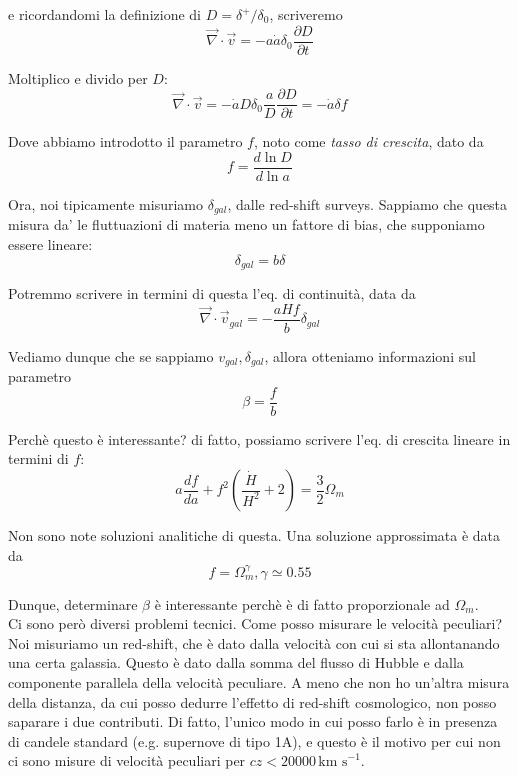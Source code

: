 \documentclass{report}
\begin{document}
e ricordandomi la definizione di $D = \delta^+/\delta_0$, scriveremo
\begin{equation}
    \vec{\nabla}\cdot \vec{v} = -a\dot{a}\delta_0\frac{\partial D}{\partial t}
\end{equation}

Moltiplico e divido per $D$: 
\begin{equation}
    \vec{\nabla}\cdot \vec{v} = -\dot{a}D\delta_0\frac{a}{D}\frac{\partial D}{\partial t} = -\dot{a}\delta f
\end{equation}

Dove abbiamo introdotto il parametro $f$, noto come \emph{tasso di crescita}, dato da 
\begin{equation}
    f = \frac{d \ln D}{d\ln a}
\end{equation}

Ora, noi tipicamente misuriamo $\delta_{gal}$, dalle red-shift surveys. Sappiamo che questa misura da' le fluttuazioni di materia meno un fattore di bias, che supponiamo essere lineare: 
\begin{equation}
    \delta_{gal} = b\delta
\end{equation}

Potremmo scrivere in termini di questa l'eq. di continuità, data da 
\begin{equation}
    \vec{\nabla}\cdot \vec{v}_{gal} = -\frac{aHf}{b}\delta_{gal}
\end{equation}

Vediamo dunque che se sappiamo $v_{gal}, \delta_{gal}$, allora otteniamo informazioni sul parametro 
\begin{equation}
    \beta = \frac{f}{b}
\end{equation}

Perchè questo è interessante? di fatto, possiamo scrivere l'eq. di crescita lineare in termini di $f$: 
\begin{equation}
    a\frac{df}{da} + f^2 \left(\frac{\dot{H}}{H^2} +2\right) = \frac{3}{2}\Omega_m
\end{equation}

Non sono note soluzioni analitiche di questa. Una soluzione approssimata è data da 
\begin{equation}
    f = \Omega_m^\gamma, \gamma \simeq 0.55
\end{equation}

Dunque, determinare $\beta$ è interessante perchè è di fatto proporzionale ad $\Omega_m$. \\

Ci sono però diversi problemi tecnici. Come posso misurare le velocità peculiari? Noi misuriamo un red-shift, che è dato dalla velocità con cui si sta allontanando una certa galassia. Questo è dato dalla somma del flusso di Hubble e dalla componente parallela della velocità peculiare. A meno che non ho un'altra misura della distanza, da cui posso dedurre l'effetto di red-shift cosmologico, non posso saparare i due contributi. Di fatto, l'unico modo in cui posso farlo è in presenza di candele standard (e.g. supernove di tipo 1A), e questo è il motivo per cui non ci sono misure di velocità peculiari per $cz < 20000 \, \text{km s}^{-1}$. \\
\end{document}
